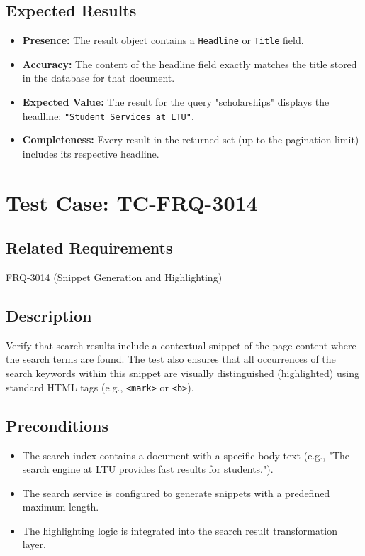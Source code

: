 \documentclass{article}
\begin{document}
\subsection*{Expected Results}
\begin{itemize}
  \item \textbf{Presence:} The result object contains a \texttt{Headline} or \texttt{Title} field.
  \item \textbf{Accuracy:} The content of the headline field exactly matches the title stored in the database for that document.
  \item \textbf{Expected Value:} The result for the query "scholarships" displays the headline: \texttt{"Student Services at LTU"}.
  \item \textbf{Completeness:} Every result in the returned set (up to the pagination limit) includes its respective headline.
\end{itemize}

\section{Test Case: TC-FRQ-3014}
\subsection*{Related Requirements}
FRQ-3014 (Snippet Generation and Highlighting)

\subsection*{Description}
Verify that search results include a contextual snippet of the page content where the search 
terms are found. The test also ensures that all occurrences of the search keywords within this snippet are 
visually distinguished (highlighted) using standard HTML tags (e.g., \texttt{<mark>} or \texttt{<b>}).

\subsection*{Preconditions}
\begin{itemize}
  \item The search index contains a document with a specific body text (e.g., "The search engine at LTU provides fast results for students.").
  \item The search service is configured to generate snippets with a predefined maximum length.
  \item The highlighting logic is integrated into the search result transformation layer.
\end{itemize}
\end{document}
